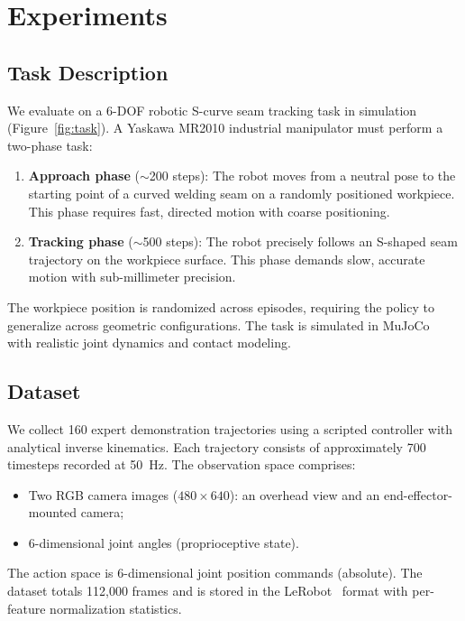 \section{Experiments}
\label{sec:experiments}

\subsection{Task Description}
\label{sec:task}

We evaluate \method{} on a 6-DOF robotic S-curve seam tracking task in simulation (Figure~\ref{fig:task}). A Yaskawa MR2010 industrial manipulator must perform a two-phase task:

\begin{enumerate}[leftmargin=*,itemsep=2pt]
    \item \textbf{Approach phase} ($\sim$200 steps): The robot moves from a neutral pose to the starting point of a curved welding seam on a randomly positioned workpiece. This phase requires fast, directed motion with coarse positioning.
    \item \textbf{Tracking phase} ($\sim$500 steps): The robot precisely follows an S-shaped seam trajectory on the workpiece surface. This phase demands slow, accurate motion with sub-millimeter precision.
\end{enumerate}

The workpiece position is randomized across episodes, requiring the policy to generalize across geometric configurations. The task is simulated in MuJoCo~\cite{todorov2012mujoco} with realistic joint dynamics and contact modeling.

\subsection{Dataset}
\label{sec:dataset}

We collect 160 expert demonstration trajectories using a scripted controller with analytical inverse kinematics. Each trajectory consists of approximately 700 timesteps recorded at 50~Hz. The observation space comprises:
\begin{itemize}[leftmargin=*,itemsep=1pt]
    \item Two RGB camera images ($480 \times 640$): an overhead view and an end-effector-mounted camera;
    \item 6-dimensional joint angles (proprioceptive state).
\end{itemize}
The action space is 6-dimensional joint position commands (absolute). The dataset totals 112,000 frames and is stored in the LeRobot~\cite{cadene2024lerobot} format with per-feature normalization statistics.

